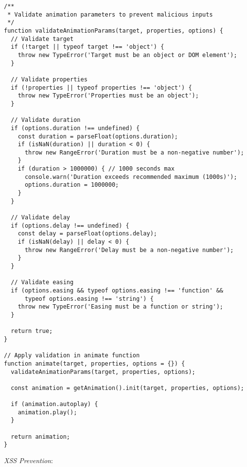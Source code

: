 \documentclass[11pt]{article}
\begin{document}
\begin{verbatim}
/**
 * Validate animation parameters to prevent malicious inputs
 */
function validateAnimationParams(target, properties, options) {
  // Validate target
  if (!target || typeof target !== 'object') {
    throw new TypeError('Target must be an object or DOM element');
  }
  
  // Validate properties
  if (!properties || typeof properties !== 'object') {
    throw new TypeError('Properties must be an object');
  }
  
  // Validate duration
  if (options.duration !== undefined) {
    const duration = parseFloat(options.duration);
    if (isNaN(duration) || duration < 0) {
      throw new RangeError('Duration must be a non-negative number');
    }
    if (duration > 1000000) { // 1000 seconds max
      console.warn('Duration exceeds recommended maximum (1000s)');
      options.duration = 1000000;
    }
  }
  
  // Validate delay
  if (options.delay !== undefined) {
    const delay = parseFloat(options.delay);
    if (isNaN(delay) || delay < 0) {
      throw new RangeError('Delay must be a non-negative number');
    }
  }
  
  // Validate easing
  if (options.easing && typeof options.easing !== 'function' && 
      typeof options.easing !== 'string') {
    throw new TypeError('Easing must be a function or string');
  }
  
  return true;
}

// Apply validation in animate function
function animate(target, properties, options = {}) {
  validateAnimationParams(target, properties, options);
  
  const animation = getAnimation().init(target, properties, options);
  
  if (animation.autoplay) {
    animation.play();
  }
  
  return animation;
}
\end{verbatim}

\emph{XSS Prevention}:
\end{document}
